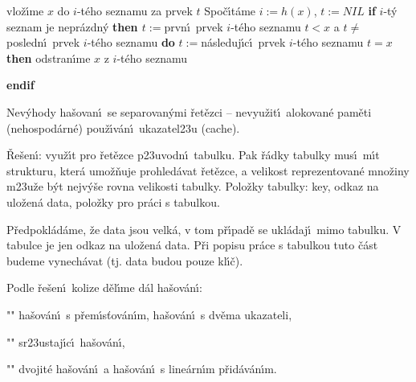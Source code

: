 \documentclass[a4paper,12pt]{article}
\begin{document}
\phantom{---}{\bf else}\newline  
\phantom{------}vlo\v z\'\i me $x$ do $i$-t\'eho seznamu za prvek $
t$\newline 
\phantom{---}{\bf endif\newline 
endif
\medskip

\flushpar DELETE$(x)$}\newline 
Spo\v c\'\i t\'ame $i:=h(x)$, $t:=NIL$\newline
{\bf if} $i$-t\'y seznam je nepr\'azdn\'y {\bf then\newline 
\phantom{{\rm ---}}$t:=$}prvn\'\i\ prvek $i$-t\'eho seznamu\newline 
\phantom{---}{\bf while} $t<x$ a $t\ne$posledn\'\i\ prvek $i$-t\'eho seznamu {\bf do}\newline 
\phantom{------}$t:=$n\'asleduj\'\i c\'\i\ prvek $i$-t\'eho seznamu\newline 
\phantom{---}{\bf enddo\newline 
endif\newline 
if} $t=x$ {\bf then} odstran\'\i me $x$ z $i$-t\'eho seznamu {\bf endif
\bigskip

}\flushpar Nev\'yhody ha\v sovan\'\i\ se separovan\'ymi \v ret\v ezci --\newline 
\phantom{---}nevyu\v zit\'\i\ alokovan\'e pam\v eti (nehospod\'arn\'e)\newline 
\phantom{---}pou\v z\'\i v\'an\'\i\ ukazatel\accent23u (cache).\newline 

\flushpar\v Re\v sen\'\i : vyu\v z\'\i t pro \v ret\v ezce p\accent23uvodn\'\i\ tabulku. Pak \v r\'adky tabulky mus\'\i\ m\'\i t strukturu, kter\'a umo\v z\v nuje prohled\'avat \v ret\v ezce, a velikost reprezentovan\'e mno\v ziny 
m\accent23u\v ze b\'yt nejv\'y\v se rovna velikosti tabulky.  
\medskip
\flushpar Polo\v zky tabulky:\newline 
\phantom{---}key,\newline 
\phantom{---}odkaz na ulo\v zen\'a data,\newline 
\phantom{---}polo\v zky pro pr\'aci s tabulkou.\medskip

\flushpar P\v redpokl\'ad\'ame, \v ze data jsou velk\'a, v tom p\v r\'\i pad\v e se 
ukl\'adaj\'\i\ mimo tabulku. V tabulce je jen odkaz na ulo\v zen\'a data. 
P\v ri popisu pr\'ace s tabulkou tuto \v c\'ast budeme vynech\'avat (tj. 
data budou pouze kl\'\i\v c).
\medskip

\flushpar Podle \v re\v sen\'\i\ kolize d\v el\'\i me d\'al ha\v sov\'an\'\i :
\roster
\item"{}"
ha\v sov\'an\'\i\ s p\v rem\'\i s\v tov\'an\'\i m, ha\v sov\'an\'\i\ s dv\v ema 
ukazateli, 
\item"{}"
sr\accent23ustaj\'\i c\'\i\ ha\v sov\'an\'\i ,
\item"{}"
dvojit\'e ha\v sov\'an\'\i\ a ha\v sov\'an\'\i\ s line\'arn\'\i m 
p\v rid\'av\'an\'\i m.
\endroster
\end{document}
